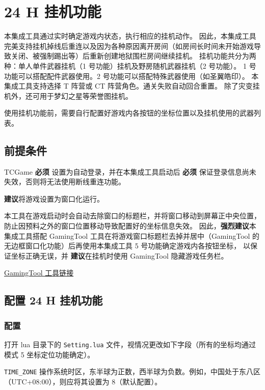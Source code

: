 \section{24 H 挂机功能}

本集成工具通过实时确定游戏内状态，执行相应的挂机动作。
因此，本集成工具完美支持挂机掉线后重连以及因为各种原因离开房间（如房间长时间未开始游戏导致关闭、被强制踢出等）后重新创建地狱围栏房间继续挂机。
挂机功能共分为两种：单人单件武器挂机（1 号功能）挂机及野房随机武器挂机（2 号功能）。
1 号功能可以搭配配件武器使用。2 号功能可以搭配特殊武器使用（如圣翼皓印）。
本集成工具支持选择 T 阵营或 CT 阵营角色。通关失败自动回合重置。
除了灾变挂机外，还可用于梦幻之星等荣誉图挂机。

使用挂机功能前，需要自行配置好游戏内各按钮的坐标位置以及挂机使用的武器列表。

\subsection{前提条件}

TCGame \textbf{必须} 设置为自动登录，并在本集成工具启动后 \textbf{必须} 保证登录信息尚未失效，否则将无法使用断线重连功能。

\textbf{建议}将游戏设置为窗口化运行。

本工具在游戏启动时会自动去除窗口的标题栏，并将窗口移动到屏幕正中央位置，防止因预料之外的窗口位置移动导致配置好的坐标信息失效。
因此，\textbf{强烈建议}本集成工具搭配 GamingTool 工具在将游戏窗口标题栏去掉并居中（GamingTool 的无边框窗口化功能）后再使用本集成工具 5 号功能确定游戏内各按钮坐标，
以保证坐标正确无误，并 \textbf{建议}在挂机时使用 GamingTool 隐藏游戏任务栏。

\href{https://gitee.com/silver1867/gaming-tool}{GamingTool 工具链接}

\subsection{配置 24 H 挂机功能}

\subsubsection{配置}

打开 lua 目录下的 \lstinline{Setting.lua} 文件，视情况更改如下字段（所有的坐标均通过模式 5 坐标定位功能确定）。

\lstinline{TIME_ZONE} 操作系统时区，东半球为正数，西半球为负数。例如，中国处于东八区（UTC+08:00），则应将其设置为 8（默认配置）。


